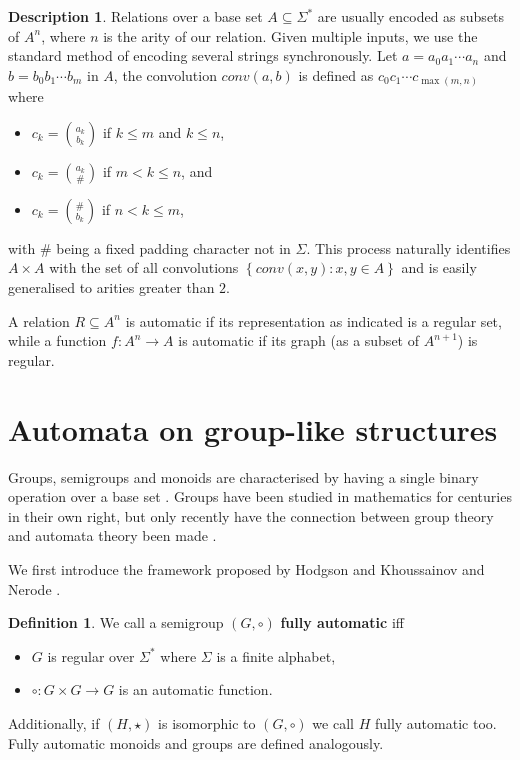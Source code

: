 \documentclass[british,a4paper,11pt,abstract=on]{scrreprt}
\theoremstyle{definition}
\newtheorem{definition}[theorem]{Definition}
\newtheorem{descr}[theorem]{Description}
\theoremstyle{remark}
\newcommand{\set}[1]{\left\{ #1 \right\}}
\begin{document}
\begin{descr}
    Relations over a base set \(A\subseteq \Sigma^*\) are usually encoded as subsets of \(A^n\),
    where \(n\) is the arity of our relation. Given multiple inputs, we use the standard method of encoding several strings synchronously.
    Let \(a = a_0a_1\cdots a_n\) and \(b = b_0b_1\cdots b_m\) in \(A\), the convolution \(conv(a,b)\) is defined as
    \(c_0c_1\cdots c_{\max(m,n)}\) where
    \begin{itemize}
        \item \(c_k = \binom{a_k}{b_k}\) if \(k\leq m\) and \(k \leq n\),
        \item \(c_k = \binom{a_k}{\#}\) if \(m < k \leq n\), and
        \item \(c_k = \binom{\#}{b_k}\) if \(n < k \leq m\),
    \end{itemize}
    with \(\#\) being a fixed padding character not in \(\Sigma\).
    This process naturally identifies \(A\times A\) with the set of all convolutions \(\set{conv(x,y):x,y\in A}\) and is
    easily generalised to arities greater than \(2\).
\end{descr}
A relation \(R\subseteq A^n\) is automatic if its representation as indicated is a regular set,
while a function \(f: A^n\to A\) is automatic if its graph (as a subset of \(A^{n+1}\)) is regular.

\section{Automata on group-like structures}

Groups, semigroups and monoids are characterised by having a single binary operation over a base set \autocite{algebre}.
Groups have been studied in mathematics for centuries in their own right, but only recently have the connection between group theory and automata theory been made
\autocite{Ho76,Ho83,KN,Epstein}.

We first introduce the framework proposed by Hodgson \autocite{Ho76,Ho83} and Khoussainov and Nerode \autocite{KN}.
\begin{definition} \label{fully automatic group}
    We call a semigroup \((G,\circ)\) \textbf{fully automatic} iff
    \begin{itemize}
        \item \(G\) is regular over \(\Sigma^*\) where \(\Sigma\) is a finite alphabet,
        \item \(\circ : G\times G\to G\) is an automatic function.
    \end{itemize}
    Additionally, if \((H,\star)\) is isomorphic to \((G,\circ)\) we call \(H\) fully automatic too.
    Fully automatic monoids and groups are defined analogously.
\end{definition}
\end{document}
